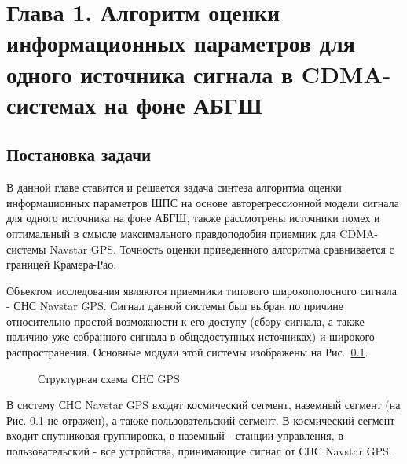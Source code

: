 \setcounter{chapter}{1}
\setcounter{section}{0}
\setcounter{equation}{0}
\setcounter{figure}{0}
\chapter*{Глава 1. Алгоритм оценки информационных параметров для одного источника сигнала в CDMA-системах на фоне АБГШ}

\section{Постановка задачи}
В данной главе ставится и решается задача синтеза  
алгоритма оценки информационных параметров ШПС на основе авторегрессионной модели сигнала для одного источника на фоне АБГШ,
также рассмотрены источники помех и оптимальный в смысле максимального правдоподобия приемник для CDMA-системы Navstar GPS. 
Точность оценки приведенного алгоритма сравнивается с границей Крамера-Рао. 

Объектом исследования являются приемники типового широкополосного сигнала - СНС Navstar GPS.
Сигнал данной системы был выбран по причине относительно простой возможности к его доступу (сбору сигнала, а также наличию уже собранного сигнала в общедоступных источниках) и широкого распространения.
Основные модули этой системы изображены на \mbox{Рис. \ref{pic:sec1_gnss_system}.}
\begin{figure}[h]
	\center{}
	\caption{Структурная схема СНС GPS}
	\label{pic:sec1_gnss_system}
\end{figure}
В систему СНС Navstar GPS входят космический сегмент, наземный сегмент (на Рис. \ref{pic:sec1_gnss_system} не
отражен), а также пользовательский сегмент. В космический сегмент входит спутниковая группировка, в 
наземный - станции управления, в пользовательский - все устройства, принимающие сигнал от СНС Navstar GPS.

